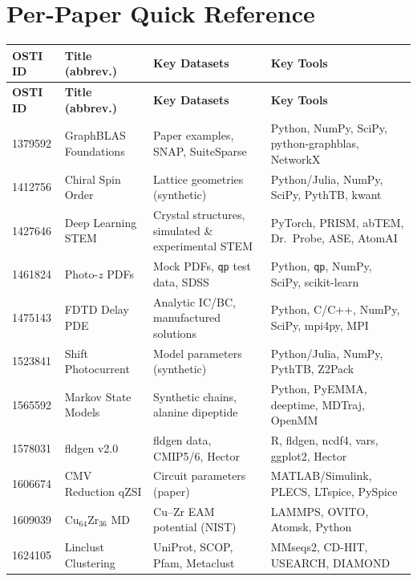 \documentclass[11pt,a4paper]{article}
\begin{document}
\newpage
\section{Per-Paper Quick Reference}
\label{sec:perpaper}

\small
\begin{longtable}{p{1.2cm} p{3.2cm} p{4cm} p{5.5cm}}
\toprule
\textbf{OSTI ID} & \textbf{Title (abbrev.)} & \textbf{Key Datasets} & \textbf{Key Tools} \\
\midrule
\endfirsthead
\toprule
\textbf{OSTI ID} & \textbf{Title (abbrev.)} & \textbf{Key Datasets} & \textbf{Key Tools} \\
\midrule
\endhead

1379592 & GraphBLAS Foundations & Paper examples, SNAP, SuiteSparse & Python, NumPy, SciPy, python-graphblas, NetworkX \\
\midrule
1412756 & Chiral Spin Order & Lattice geometries (synthetic) & Python/Julia, NumPy, SciPy, PythTB, kwant \\
\midrule
1427646 & Deep Learning STEM & Crystal structures, simulated \& experimental STEM & PyTorch, PRISM, abTEM, Dr.\ Probe, ASE, AtomAI \\
\midrule
1461824 & Photo-$z$ PDFs & Mock PDFs, \texttt{qp} test data, SDSS & Python, \texttt{qp}, NumPy, SciPy, scikit-learn \\
\midrule
1475143 & FDTD Delay PDE & Analytic IC/BC, manufactured solutions & Python, C/C++, NumPy, SciPy, mpi4py, MPI \\
\midrule
1523841 & Shift Photocurrent & Model parameters (synthetic) & Python/Julia, NumPy, PythTB, Z2Pack \\
\midrule
1565592 & Markov State Models & Synthetic chains, alanine dipeptide & Python, PyEMMA, deeptime, MDTraj, OpenMM \\
\midrule
1578031 & fldgen v2.0 & fldgen data, CMIP5/6, Hector & R, fldgen, ncdf4, vars, ggplot2, Hector \\
\midrule
1606674 & CMV Reduction qZSI & Circuit parameters (paper) & MATLAB/Simulink, PLECS, LTspice, PySpice \\
\midrule
1609039 & Cu$_{64}$Zr$_{36}$ MD & Cu--Zr EAM potential (NIST) & LAMMPS, OVITO, Atomsk, Python \\
\midrule
1624105 & Linclust Clustering & UniProt, SCOP, Pfam, Metaclust & MMseqs2, CD-HIT, USEARCH, DIAMOND \\

\end{longtable}
\end{document}
